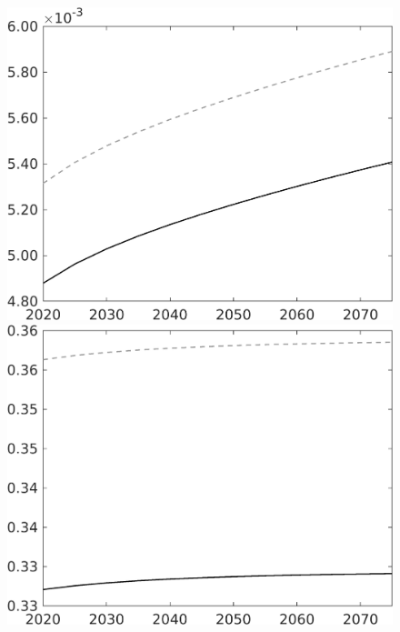 \documentclass[12pt]{article}
\begin{document}
\begin{figure}[h!!]
\begin{minipage}[]{0.32\textwidth}
	\end{minipage}	
	\begin{minipage}[]{0.32\textwidth}
		\includegraphics[width=1\textwidth]{../../codding_model/own_basedOnFried/optimalPol_010922_revision/figures/all_13Sept22/CompTaul_Equlab_LFBAU_Reg0_Lg_spillover0_nsk1_xgr0_knspil0_sep1_countec0_GovRev0_etaa0.79_lgd0.png}
	\end{minipage}	
	\begin{minipage}[]{0.32\textwidth}
		\includegraphics[width=1\textwidth]{../../codding_model/own_basedOnFried/optimalPol_010922_revision/figures/all_13Sept22/CompTaul_Equlab_LFBAU_Reg0_Ln_spillover0_nsk1_xgr0_knspil0_sep1_countec0_GovRev0_etaa0.79_lgd0.png}

\end{minipage}
\end{figure}
\end{document}
